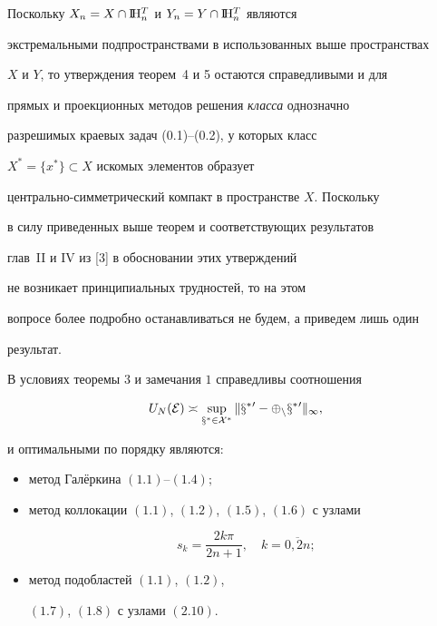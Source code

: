 \begin{note}


Поскольку $X_n=X\cap\mathrm I \!\mathrm H_n^T$ и $Y_n=Y\cap \mathrm I \!\mathrm H_n^T$ являются


экстремальными подпространствами в использованных выше пространствах 


$X$ и $Y$, то утверждения теорем~4 и 5 остаются справедливыми и для


прямых и проекционных методов решения {\em класса} однозначно


разрешимых краевых задач (0.1)--(0.2), у которых класс


$X^*=\{ x^*\}\subset X$ искомых элементов образует


центрально-симметрический компакт в пространстве $X$. Поскольку


в силу приведенных выше теорем и соответствующих результатов


глав~II и IV из [3] в обосновании этих утверждений


не возникает принципиальных трудностей, то на этом


вопросе более подробно останавливаться не будем, а приведем лишь один


результат.


\end{note}





\begin{thm}


В условиях теоремы $3$ и замечания $1$ справедливы соотношения


$$


U_N(\rukopis{E})\asymp \sup_{x^*\in X^*} \|x^*{}'-


\Phi_nx^*{}'\|_{\infty},


$$


и оптимальными по порядку являются$:$


\begin{itemize}


\item[а)] метод Гал\"еркина $(1.1)$--$(1.4);$


\item[б)] метод коллокации $(1.1)$, $(1.2)$, $(1.5)$, $(1.6)$ с узлами


$$


s_k=\frac{2k\pi}{2n+1},\quad k=\overline{0,2n};


$$


\item[в)] метод подобластей $(1.1)$, $(1.2)$,


$(1.7)$, $(1.8)$ с узлами $(2.10)$.


\end{itemize}


\end{thm}





